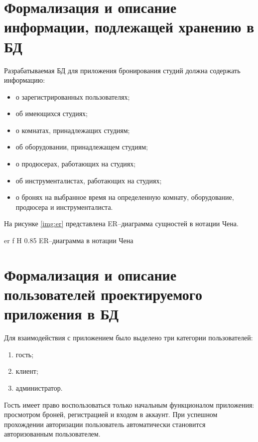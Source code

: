 \section{Формализация и описание информации, подлежащей хранению в БД}
Разрабатываемая БД для приложения бронирования студий должна содержать информацию:
\begin{itemize}
	\item о зарегистрированных пользователях;
	\item об имеющихся студиях;
	\item о комнатах, принадлежащих студиям;
	\item об оборудовании, принадлежащем студиям;
	\item о продюсерах, работающих на студиях;
	\item об инструменталистах, работающих на студиях;
	\item о бронях на выбранное время на определенную комнату, оборудование, продюсера и инструменталиста.
\end{itemize}

На рисунке \ref{img:er} представлена ER--диаграмма сущностей в нотации Чена.

\begin{sidewaysfigure}
	{er} %
	{f} %
	{H} %
	{0.85\textwidth} %
	{ER--диаграмма в нотации Чена} %
\end{sidewaysfigure}

\newpage

\section{Формализация и описание пользователей проектируемого приложения в БД}
Для взаимодействия с приложением было выделено три категории пользователей:
\begin{enumerate}
	\item гость;
	\item клиент;
	\item администратор.
\end{enumerate}

Гость имеет право воспользоваться только начальным функционалом приложения: просмотром броней, регистрацией и входом в аккаунт.
При успешном прохождении авторизации пользователь автоматически становится авторизованным пользователем.

